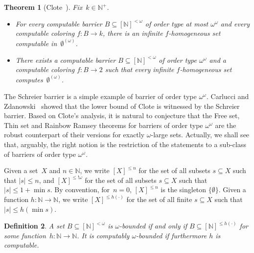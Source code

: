 \documentclass[10pt,a4paper]{article}
\newcommand{\NN}[0]{\mathbb{N}}
\newtheorem{theorem}{Theorem}
\numberwithin{theorem}{section}
\newtheorem{definition}[theorem]{Definition}
\begin{document}
\begin{theorem}[Clote~\cite{clote1984recursion}]\label{thm:Clote}
Fix~$k \in \NN^+$.
\begin{itemize}
    \item For every computable barrier $B \subseteq [\NN]^{<\omega}$ of order type at most $\omega^\omega$ and every computable coloring $f : B \to k$, there is an infinite $f$-homogeneous set computable in~$\emptyset^{(\omega)}$.
    \item There exists a computable barrier $B \subseteq [\NN]^{<\omega}$ of order type $\omega^\omega$ and a computable coloring $f : B \to 2$ such that every infinite $f$-homogeneous set computes~$\emptyset^{(\omega)}$.
\end{itemize}
\end{theorem}

The Schreier barrier is a simple example of barrier of order type $\omega^\omega$. Carlucci and Zdanowski~\cite{carlucci2014strength} showed that the lower bound of Clote is witnessed by the Schreier barrier.
Based on Clote's analysis, it is natural to conjecture that the Free set, Thin set and Rainbow Ramsey theorems for barriers of order type $\omega^\omega$ are the robust counterpart of their versions for exactly $\omega$-large sets. Actually, we shall see that, arguably, the right notion is the restriction of the statements to a sub-class of barriers of order type $\omega^\omega$.

Given a set~$X$ and $n \in \NN$, we write $[X]^{\leq n}$ for the set of all subsets $s \subseteq X$ such that $|s| \leq n$, and $[X]^{\leq !\omega}$ for the set of all subsets $s \subseteq X$ such that $|s| \leq 1+\min s$. By convention, for~$n = 0$, $[X]^{\leq n}$ is the singleton $\{\emptyset\}$. Given a function $h : \NN \to \NN$, we write $[X]^{\leq h(\cdot)}$ for the set of all finite $s \subseteq X$ such that $|s| \leq h(\min s)$. %

\begin{definition}
A set $B \subseteq [\NN]^{<\omega}$ is \emph{$\omega$-bounded} if and only if $B \subseteq [\NN]^{\leq h(\cdot)}$ for some function~$h : \NN \to \NN$. It is \emph{computably $\omega$-bounded} if furthermore $h$ is computable.
\end{definition}
\end{document}
